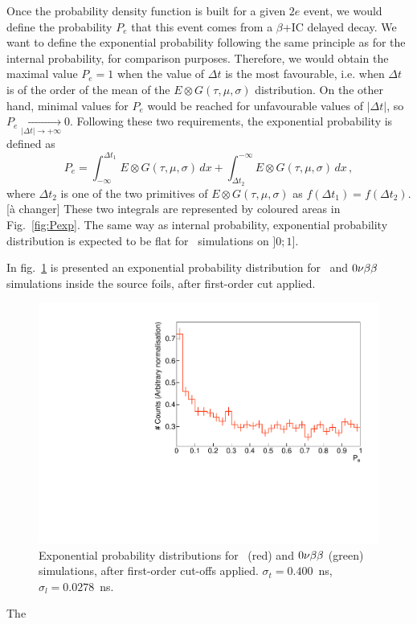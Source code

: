 Once the probability density function is built for a given $2e$ event, we would define the probability $P_{e}$ that this event comes from a $\beta$+IC delayed decay.
We want to define the exponential probability following the same principle as for the internal probability, for comparison purposes.
Therefore, we would obtain the maximal value $P_{e}=1$ when the value of $\Delta t$ is the most favourable, i.e. when $\Delta t$ is of the order of the mean of the $E \otimes G (\tau,\mu,\sigma)$ distribution.
On the other hand, minimal values for $P_{e}$ would be reached for unfavourable values of $|\Delta t|$, so $P_{e} \xrightarrow[|\Delta t| \rightarrow +\infty]{} 0$.
Following these two requirements, the exponential probability is defined as
\begin{equation}
  P_{e} = \int_{-\infty}^{\Delta t_{1}} E \otimes G (\tau,\mu,\sigma)\, dx + \int_{\Delta t_{2}}^{-\infty} E \otimes G (\tau,\mu,\sigma)\, dx\,,
\end{equation}
where $\Delta t_{2}$ is one of the two primitives of $E \otimes G (\tau,\mu,\sigma)$ as $f(\Delta t_{1})=f(\Delta t_{2})$.[à changer]
These two integrals are represented by coloured areas in Fig.~\ref{fig:Pexp}.
The same way as internal probability, exponential probability distribution is expected to be flat for \Tl\ simulations on $]0;1]$.

In fig.~\ref{fig:Pexp_Tl} is presented an exponential probability distribution for \Tl\ and $0\nu\beta\beta$ simulations inside the source foils, after first-order cut applied.
\begin{figure}
  \centering
  \includegraphics[width=13cm]{timedifference/fig_timediff/208Tl_expo.pdf}
  \caption{Exponential probability distributions for \Tl\ (red) and $0\nu\beta\beta$ (green) simulations, after first-order cut-offs applied.
    $\sigma_{t}=0.400$~ns, $\sigma_{l}=0.0278$~ns.
    \label{fig:Pexp_Tl}}
\end{figure}
The


